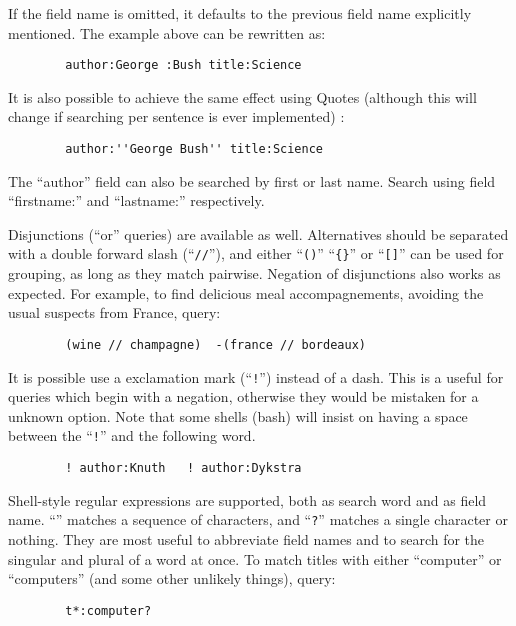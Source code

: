 \documentclass[11pt]{article}
\begin{document}
   If the field name is omitted, it defaults to the previous field name
   explicitly mentioned. The example above can be rewritten as:


\begin{verbatim}
        author:George :Bush title:Science
\end{verbatim}


   It is also possible to achieve the same effect using Quotes
   (although this will change if searching per sentence is ever
   implemented) :


\begin{verbatim}
        author:''George Bush'' title:Science
\end{verbatim}


   The ``author'' field can also be searched by first or last name. Search
   using field ``firstname:'' and ``lastname:'' respectively. 


   Disjunctions (``or'' queries) are available as well. Alternatives
   should be separated with a double forward slash (``{\tt //}''), and
   either ``{\tt ()}'' ``{\tt \{\}}'' or ``{\tt []}'' can be used for
   grouping, as long as they match pairwise. Negation of disjunctions
   also works as expected. For example, to find delicious meal accompagnements,
   avoiding the usual suspects from France, query:


\begin{verbatim}
        (wine // champagne)  -(france // bordeaux)
\end{verbatim}


   It is possible use a exclamation mark (``{\tt !}'') instead of a dash. This is a
   useful for queries which begin with a negation, otherwise they would be
   mistaken for a unknown option. Note that some shells (bash) will insist on
   having a space between the ``{\tt !}'' and the following word.


\begin{verbatim}
        ! author:Knuth   ! author:Dykstra
\end{verbatim}


   Shell-style regular expressions are supported, both as search word and as
   field name. ``{\tt *}'' matches a sequence of characters, and ``{\tt ?}'' matches
   a single character or nothing. They are most useful to abbreviate field names
   and to search for the singular and plural of a word at once. To match titles
   with either ``computer'' or ``computers'' (and some other unlikely things),
   query:


\begin{verbatim}
        t*:computer?
\end{verbatim}
\end{document}

